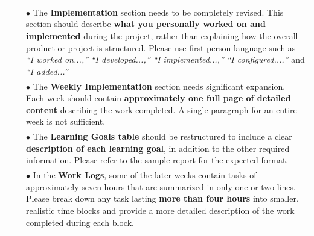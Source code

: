 \documentclass[12pt,oneside,letterpaper]{article}
\begin{document}
{\begin{longtable}{@{\hspace{\tabcolsep}}p{}p{}p{}@{\hspace{\tabcolsep}}}
 & & $\bullet$ The \textbf{Implementation} section needs to be completely revised. This section should describe \textbf{what you personally worked on and implemented} during the project, rather than explaining how the overall product or project is structured. Please use first-person language such as \emph{``I worked on...,''} \emph{``I developed...,''} \emph{``I implemented...,''} \emph{``I configured...,''} and \emph{``I added...''} \\
 & & $\bullet$ The \textbf{Weekly Implementation} section needs significant expansion. Each week should contain \textbf{approximately one full page of detailed content} describing the work completed. A single paragraph for an entire week is not sufficient. \\
 & & $\bullet$ The \textbf{Learning Goals table} should be restructured to include a clear \textbf{description of each learning goal}, in addition to the other required information. Please refer to the sample report for the expected format. \\
 & & $\bullet$ In the \textbf{Work Logs}, some of the later weeks contain tasks of approximately seven hours that are summarized in only one or two lines. Please break down any task lasting \textbf{more than four hours} into smaller, realistic time blocks and provide a more detailed description of the work completed during each block. \\
\end{longtable}}
\end{document}
